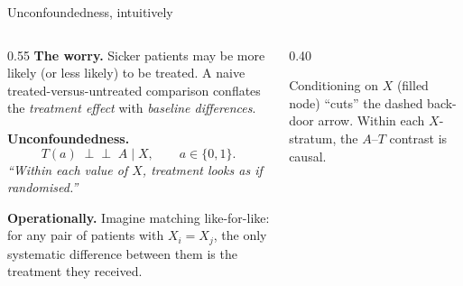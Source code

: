 \documentclass[10pt,aspectratio=169]{beamer}
\newcommand{\indep}{\perp\!\!\!\perp}
\begin{document}
\begin{frame}{Unconfoundedness, intuitively}
\begin{columns}[T,onlytextwidth]
\begin{column}{0.55\textwidth}
\textbf{The worry.} Sicker patients may be more likely (or less likely) to be treated. A naive treated-versus-untreated comparison conflates the \emph{treatment effect} with \emph{baseline differences}.

\bigskip

\textbf{Unconfoundedness.}
\[
T(a) \;\indep\; A \;\Big|\; X, \qquad a \in \{0,1\}.
\]
\emph{``Within each value of $X$, treatment looks as if randomised.''}

\bigskip

\textbf{Operationally.} Imagine \alert{matching like-for-like}: for any pair of patients with $X_i = X_j$, the only systematic difference between them is the treatment they received.
\end{column}
\begin{column}{0.40\textwidth}
\centering
{}

\vspace{0.4cm}
{\footnotesize Conditioning on $X$ (filled node) ``cuts'' the dashed back-door arrow. Within each $X$-stratum, the $A$--$T$ contrast is causal.}
\end{column}
\end{columns}
\end{frame}
\end{document}
